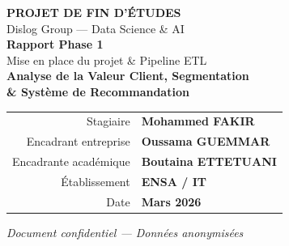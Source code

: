 \documentclass[11pt,a4paper]{article}
\begin{document}
\begin{titlepage}

\vspace*{1.5cm}
\begin{center}
  {\fontsize{14}{16}\selectfont\color{white}\bfseries PROJET DE FIN D'ÉTUDES}\\[6pt]
  {\fontsize{11}{13}\selectfont\color{white!80}Dislog Group --- Data Science \& AI}\\[2.5cm]

  {\fontsize{28}{34}\selectfont\color{white}\bfseries Rapport Phase 1}\\[10pt]
  {\fontsize{16}{20}\selectfont\color{white!90} Mise en place du projet \& Pipeline ETL}\\[4.5cm]

  {\fontsize{13}{16}\selectfont\color{darktext}\bfseries
    Analyse de la Valeur Client, Segmentation\\
    \& Système de Recommandation}\\[1.5cm]

  \begin{tabular}{r@{\hskip 12pt}l}
    {\color{graytext}\small Stagiaire}        & {\color{darktext}\bfseries Mohammed FAKIR} \\[4pt]
    {\color{graytext}\small Encadrant entreprise} & {\color{darktext}\bfseries Oussama GUEMMAR} \\[4pt]
    {\color{graytext}\small Encadrante académique}  & {\color{darktext}\bfseries Boutaina ETTETUANI} \\[4pt]
    {\color{graytext}\small Établissement}    & {\color{darktext}\bfseries ENSA / IT} \\[4pt]
    {\color{graytext}\small Date}             & {\color{darktext}\bfseries Mars 2026} \\
  \end{tabular}

  \vfill
  {\color{graytext}\small\itshape Document confidentiel --- Données anonymisées}
\end{center}
\restoregeometry
\end{titlepage}
\end{document}
